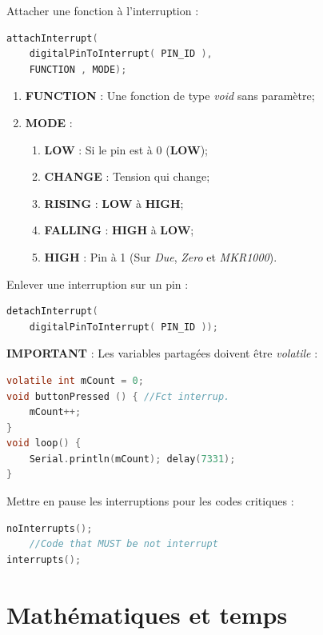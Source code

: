        \bmar
            Attacher une fonction à l'interruption :
        \emar
        \begin{lstlisting}[language=C]
attachInterrupt(
    digitalPinToInterrupt( PIN_ID ),
    FUNCTION , MODE);
        \end{lstlisting}

        \begin{enumerate}
            \item \textbf{FUNCTION} : Une fonction de type \textit{void} sans paramètre;
            \item \textbf{MODE} :
            \begin{enumerate}
                \item \textbf{LOW} : Si le pin est à 0 (\textbf{LOW});
                \item \textbf{CHANGE} : Tension qui change;
                \item \textbf{RISING} : \textbf{LOW} à \textbf{HIGH};
                \item \textbf{FALLING} : \textbf{HIGH} à \textbf{LOW};
                \item \textbf{HIGH} : Pin à 1 (Sur \textit{Due}, \textit{Zero} et \textit{MKR1000}).
            \end{enumerate}
        \end{enumerate}

        \bmar
            Enlever une interruption sur un pin :
        \emar
        \begin{lstlisting}[language=C]
detachInterrupt(
    digitalPinToInterrupt( PIN_ID ));
        \end{lstlisting}

        \bmar
            \textbf{IMPORTANT} : Les variables partagées doivent être \textit{volatile} :
        \emar

        \begin{lstlisting}[language=C]
volatile int mCount = 0;
void buttonPressed () { //Fct interrup.
    mCount++;
}
void loop() {
    Serial.println(mCount); delay(7331);
}
        \end{lstlisting}
        \bmar
            Mettre en pause les interruptions pour les codes critiques :
        \emar
        \begin{lstlisting}[language=C]
noInterrupts();
    //Code that MUST be not interrupt
interrupts();
        \end{lstlisting}
    \section{Mathématiques et temps}
